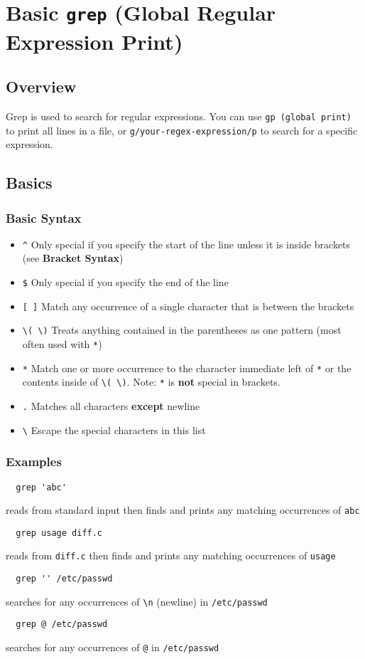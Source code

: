 \documentclass[13pt]{article}
\begin{document}
\section{Basic \texttt{grep} (Global Regular Expression Print)}
\subsection{Overview}
Grep is used to search for regular expressions. You can use \texttt{gp (global print)} to print all lines in a file, or \texttt{g/your-regex-expression/p} to search for a specific expression.
\subsection{Basics}
\subsubsection{Basic Syntax}
\begin{itemize}[leftmargin = 0pt]
\item [] \texttt{\^} Only special if you specify the start of the line unless it is inside brackets (see \textbf{Bracket Syntax})
\item [] \texttt{\$} Only special if you specify the end of the line
\item [] \texttt{[ ]} Match any occurrence of a single character that is between the brackets
\item [] \texttt{\textbackslash ( \textbackslash )} Treats anything contained in the parentheses as one pattern (most often used with \texttt{*})
\item [] \texttt{*} Match one or more occurrence to the character immediate left of \texttt{*} or the contents inside of \texttt{\textbackslash ( \textbackslash )}. Note: \texttt{*} is \textbf{not} special in brackets.
\item[] \texttt{.} Matches all characters \textbf{except} newline
\item [] \texttt{\textbackslash} Escape the special characters in this list
\end{itemize}

\subsubsection*{Examples}
\begin{verbatim}
  grep 'abc' \end{verbatim}
reads from standard input then finds and prints any matching occurrences of \texttt{abc}
\begin{verbatim}
  grep usage diff.c \end{verbatim}
reads from \texttt{diff.c} then finds and prints any matching occurrences of \texttt{usage}
\begin{verbatim}
  grep '' /etc/passwd \end{verbatim}
searches for any occurrences of \texttt{\textbackslash n} (newline) in \texttt{/etc/passwd}
\begin{verbatim}
  grep @ /etc/passwd \end{verbatim}
searches for any occurrences of \texttt{@} in \texttt{/etc/passwd}
\end{document}
